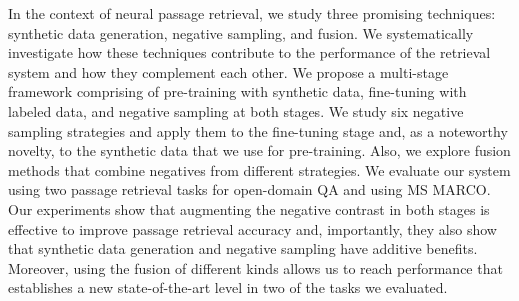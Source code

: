 In the context of neural passage retrieval, we study three promising techniques: synthetic data generation, negative sampling, and fusion. We systematically investigate how these techniques contribute to the performance of the retrieval system and how they complement each other. We propose a multi-stage framework comprising of pre-training with synthetic data, fine-tuning with labeled data, and negative sampling at both stages. We study six negative sampling strategies and apply them to the fine-tuning stage and, as a noteworthy novelty, to the synthetic data that we use for pre-training. Also, we explore fusion methods that combine negatives from different strategies. We evaluate our system using two passage retrieval tasks for open-domain QA and using MS MARCO. Our experiments show that augmenting the negative contrast in both stages is effective to improve passage retrieval accuracy and, importantly, they also show that synthetic data generation and negative sampling have additive benefits. Moreover, using the fusion of different kinds allows us to reach performance that establishes a new state-of-the-art level in two of the tasks we evaluated.
